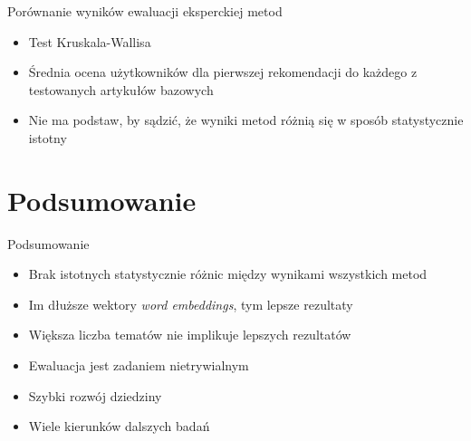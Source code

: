 \documentclass{beamer}
\begin{document}
	\begin{frame}{Porównanie wyników ewaluacji eksperckiej metod}
		\begin{itemize}
			\setlength\itemsep{2em}
			\item Test Kruskala-Wallisa
			\item Średnia ocena użytkowników dla pierwszej rekomendacji do każdego z testowanych artykułów bazowych
			\item Nie ma podstaw, by sądzić, że wyniki metod różnią się w sposób statystycznie istotny
		\end{itemize}
	\end{frame}
	\section{Podsumowanie}
	\begin{frame}{Podsumowanie}
		\begin{itemize}
			\setlength\itemsep{1.1em}
			\item Brak istotnych statystycznie różnic między wynikami wszystkich metod
			\item Im dłuższe wektory \emph{word embeddings}, tym lepsze rezultaty
			\item Większa liczba tematów nie implikuje lepszych rezultatów
		\end{itemize}
		\begin{itemize}
			\setlength\itemsep{1.1em}
			\item Ewaluacja jest zadaniem nietrywialnym
			\item Szybki rozwój dziedziny
			\item Wiele kierunków dalszych badań
		\end{itemize}
	\end{frame}
\end{document}
